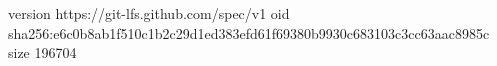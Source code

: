 version https://git-lfs.github.com/spec/v1
oid sha256:e6c0b8ab1f510c1b2c29d1ed383efd61f69380b9930c683103c3cc63aac8985c
size 196704
